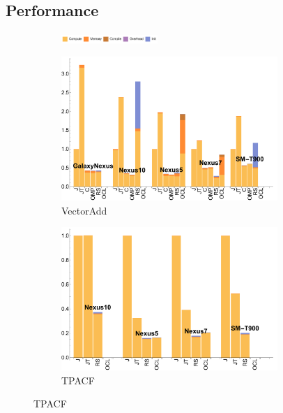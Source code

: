\subsection{Performance}


\begin{figure}[ht]

  \begin{subfigure}[b]{\textwidth}
          \centering
          \includegraphics[width=0.4\textwidth]{data/legend.pdf}
  \end{subfigure}

  \begin{subfigure}[b]{0.5\textwidth}
      \centering
      \includegraphics[width=0.9\textwidth]{data/VectorAdd_time.pdf}
      \caption{VectorAdd}\label{fig:vectoradd}
  \end{subfigure}
  \begin{subfigure}[b]{0.5\textwidth}
      \centering
      \includegraphics[width=0.9\textwidth]{data/Tpacf_time.pdf}
      \caption{TPACF}
      \label{fig:TPACF}
  \end{subfigure}


\end{figure}
